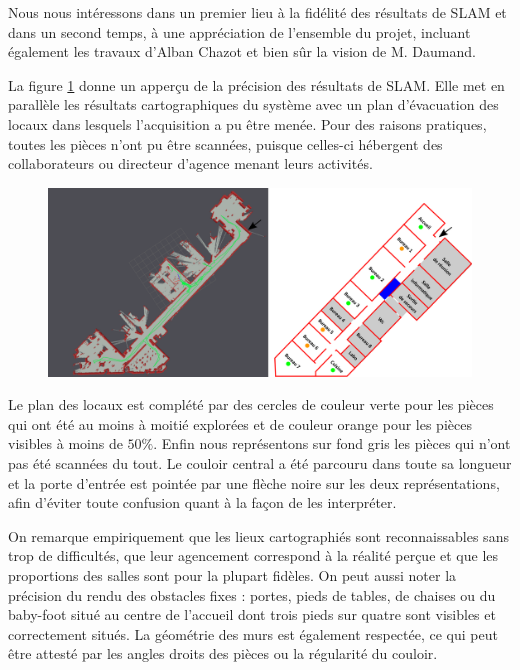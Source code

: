   Nous nous intéressons dans un premier lieu à la fidélité des résultats de SLAM et dans un second temps, à une appréciation de l'ensemble du projet, incluant également les travaux d'Alban Chazot et bien sûr la vision de M. Daumand.  
  
  La figure \ref{fig:carto} donne un apperçu de la précision des résultats de SLAM. 
  Elle met en parallèle les résultats cartographiques du système avec un plan d'évacuation des locaux dans lesquels l'acquisition a pu être menée. 
  Pour des raisons pratiques, toutes les pièces n'ont pu être scannées, puisque celles-ci hébergent des collaborateurs ou directeur d'agence menant leurs activités.
  
  \begin{figure}[h]
    \centering
      \includegraphics[width=1.\linewidth]{figures/plan}  
    \label{fig:carto}
  \end{figure}
  
  Le plan des locaux est complété par des cercles de couleur verte pour les pièces qui ont été au moins à moitié explorées et de couleur orange pour les pièces visibles à moins de $50\%$. 
  Enfin nous représentons sur fond gris les pièces qui n'ont pas été scannées du tout. 
  Le couloir central a été parcouru dans toute sa longueur et la porte d'entrée est pointée par une flèche noire sur les deux représentations, afin d'éviter toute confusion quant à la façon de les interpréter. 
  
  On remarque empiriquement que les lieux cartographiés sont reconnaissables sans trop de difficultés, que leur agencement correspond à la réalité perçue et que les proportions des salles sont pour la plupart fidèles. 
  On peut aussi noter la précision du rendu des obstacles fixes : portes, pieds de tables, de chaises ou du baby-foot situé au centre de l'accueil dont trois pieds sur quatre sont visibles et correctement situés. 
  La géométrie des murs est également respectée, ce qui peut être attesté par les angles droits des pièces ou la régularité du couloir. 
  
